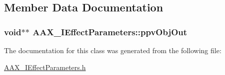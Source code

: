\subsection{Member Data Documentation}
\hypertarget{a00099_ae2e7b2d7553902b3e8163e8d1ef640dc}{}
\subsubsection[{ppv\+Obj\+Out}]{\setlength{\rightskip}{0pt plus 5cm}void$\ast$$\ast$ A\+A\+X\+\_\+\+I\+Effect\+Parameters\+::ppv\+Obj\+Out}\label{a00099_ae2e7b2d7553902b3e8163e8d1ef640dc}


The documentation for this class was generated from the following file\+:\begin{DoxyCompactItemize}
\item 
\hyperlink{a00247}{A\+A\+X\+\_\+\+I\+Effect\+Parameters.\+h}\end{DoxyCompactItemize}
